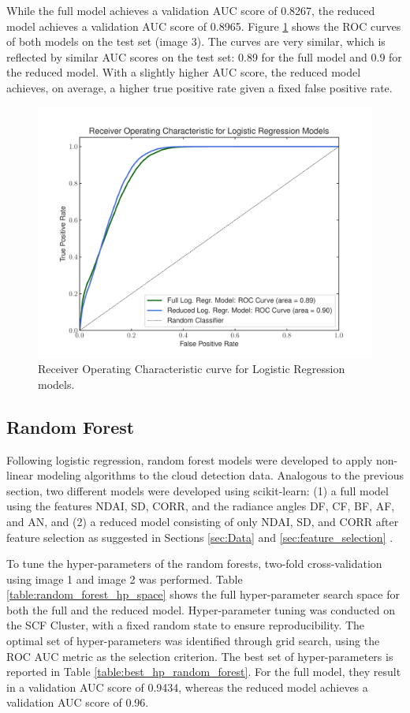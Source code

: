 \documentclass[11pt,letterpaper]{article}
\begin{document}
While the full model achieves a validation AUC score of 0.8267, the reduced model achieves a validation AUC score of 0.8965. Figure \ref{fig_roc_loc_regr} shows the ROC curves of both models on the test set (image 3). The curves are very similar, which is reflected by similar AUC scores on the test set: 0.89 for the full model and 0.9 for the reduced model. With a slightly higher AUC score, the reduced model achieves, on average, a higher true positive rate given a fixed false positive rate.

\begin{figure}[H]
    \centering
    \includegraphics[width=\linewidth]{figs/roc_log_regr.pdf}
    \caption{Receiver Operating Characteristic curve for Logistic Regression models.}
    \label{fig_roc_loc_regr}
\end{figure}

\subsection{Random Forest}
Following logistic regression, random forest models were developed to apply non-linear modeling algorithms to the cloud detection data. Analogous to the previous section, two different models were developed using scikit-learn: (1) a full model using the features NDAI, SD, CORR, and the radiance angles DF, CF, BF, AF, and AN, and (2) a reduced model consisting of only NDAI, SD, and CORR after feature selection as suggested in Sections \ref{sec:Data} and \ref{sec:feature_selection} \parencite[]{scikit-learn}.

To tune the hyper-parameters of the random forests, two-fold cross-validation using image 1 and image 2 was performed. Table \ref{table:random_forest_hp_space} shows the full hyper-parameter search space for both the full and the reduced model. Hyper-parameter tuning was conducted on the SCF Cluster, with a fixed random state to ensure reproducibility. The optimal set of hyper-parameters was identified through grid search, using the ROC AUC metric as the selection criterion. The best set of hyper-parameters is reported in Table \ref{table:best_hp_random_forest}. For the full model, they result in a validation AUC score of 0.9434, whereas the reduced model achieves a validation AUC score of 0.96.
\end{document}
